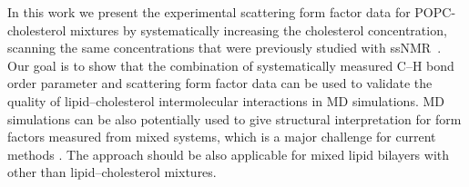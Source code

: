 \documentclass[aps,prl,superscriptaddress,twocolumn]{revtex4}
\begin{document}
In this work we present the experimental scattering form factor
data for POPC-cholesterol mixtures by systematically increasing the
cholesterol concentration, scanning the same concentrations that were previously studied with ssNMR~\cite{ferreira13}.
Our goal is to show that the combination
of systematically measured C--H bond order parameter and scattering form
factor data can be used to validate the quality of lipid--cholesterol
intermolecular interactions in MD simulations. MD simulations can be also
potentially used to give structural interpretation for form factors
measured from mixed systems, which is a major challenge for current methods \cite{pan12,Heftberger15,Marquardt15,??}. 
The approach should be also applicable for mixed lipid bilayers with
other than lipid--cholesterol mixtures.






\end{document}
